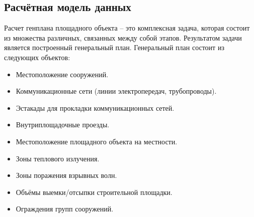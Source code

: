 \subsection*{\large{Расчётная модель данных}}

Расчет генплана площадного объекта -- это комплексная задача, которая состоит из множества различных,
связанных между собой этапов. Результатом задачи является построенный генеральный план.
Генеральный план состоит из следующих объектов:
\begin{itemize}
	\item Местоположение сооружений.
	\item Коммуникационные сети (линии электропередач, трубопроводы).
	\item Эстакады для прокладки коммуникационных сетей.
	\item Внутриплощадочные проезды.
	\item Местоположение площадного объекта на местности.
	\item Зоны теплового излучения.
	\item Зоны поражения взрывных волн.
	\item Объёмы выемки/отсыпки строительной площадки.
	\item Ограждения групп сооружений.
\end{itemize}